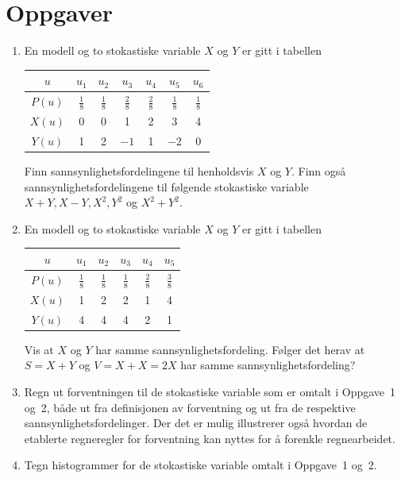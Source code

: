 \section{Oppgaver}
\small
\begin{enumerate}
\item En modell og to stokastiske variable $X$ og $Y$ er gitt i
     tabellen
     \begin{center}
     \begin{tabular}{c|cccccc}
     $u$&$u_1$&$u_2$&$u_3$&$u_4$&$u_5$&$u_6$ \\ \hline
     $P(u)$&$\frac{1}{8}$&$\frac{1}{8}$&$\frac{2}{8}$&$\frac{2}{8}$
                            &$\frac{1}{8}$&$\frac{1}{8}$ \\
     $X(u)$&0&0&1&2&3&4 \\
     $Y(u)$&1&2&$-1$&1&$-2$&0
     \end{tabular}
     \end{center}   
     Finn sannsynlighetsfordelingene til henholdsvis $X$ og $Y$.
     Finn også sannsynlighetsfordelingene til følgende
     stokastiske variable $X+Y, X-Y, X^2, Y^2$ og $X^2 + Y^2$.

\item En modell og to stokastiske variable $X$ og $Y$ er gitt i
     tabellen
     \begin{center}
     \begin{tabular}{c|ccccc}
     $u$&$u_1$&$u_2$&$u_3$&$u_4$&$u_5$ \\ \hline
     $P(u)$&$\frac{1}{8}$&$\frac{1}{8}$&$\frac{1}{8}$&$\frac{2}{8}$
                            &$\frac{3}{8}$ \\
     $X(u)$&1&2&2&1&4 \\
     $Y(u)$&4&4&4&2&1
     \end{tabular}
     \end{center}   
     Vis at $X$ og $Y$ har samme sannsynlighetsfordeling. Følger
     det herav at $S=X+Y$ og $V=X+X=2X$ har samme
     sannsynlighetsfordeling?

\item Regn ut forventningen til de stokastiske variable som er
     omtalt i Oppgave~1 og~2, både ut fra definisjonen av
     forventning og ut fra de respektive
     sannsynlighetsfordelinger. Der det er mulig illustrerer også
     hvordan de etablerte regneregler for forventning kan nyttes
     for å forenkle regnearbeidet.

\item Tegn histogrammer for de stokastiske variable omtalt i Oppgave~1 og~2.


\end{enumerate}
